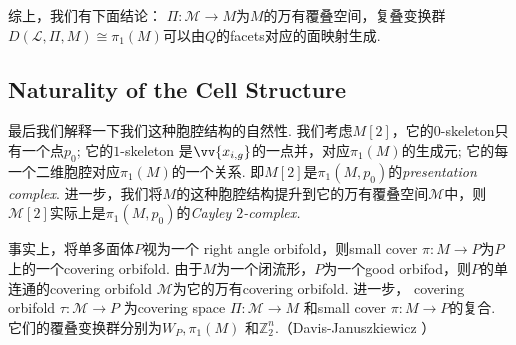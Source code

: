 \documentclass{article}
\theoremstyle{plain}%
\theoremstyle{definition}
\theoremstyle{remark}
\begin{document}
{%



综上，我们有下面结论：
{\thm $\Pi:\mathcal{M}\longrightarrow M$为$M$的万有覆叠空间，复叠变换群$D(\mathcal{L},\Pi,M)\cong\pi_1(M)$可以由$Q$的facets对应的面映射生成.}

\subsection{Naturality of the Cell Structure}
最后我们解释一下我们这种胞腔结构的自然性. 我们考虑$M[2]$，它的$0$-skeleton只有一个点$p_0$; 它的$1$-skeleton 是$\vv{x_{i,g}}$的一点并，对应$\pi_1(M)$的生成元; 它的每一个二维胞腔对应$\pi_1(M)$的一个关系. 即$M[2]$是$\pi_1(M,p_0)$的{\em presentation complex}.
进一步，我们将$M$的这种胞腔结构提升到它的万有覆叠空间$\mathcal{M}$中，则$\mathcal{M}[2]$实际上是$\pi_1(M,p_0)$的{\em Cayley $2$-complex.}

事实上，将单多面体$P$视为一个 right angle orbifold，则small cover $\pi:M\longrightarrow P$为$P$上的一个covering orbifold. 
由于$M$为一个闭流形，$P$为一个good orbifod，则$P$的单连通的covering orbifold $\mathcal{M}$为它的万有covering orbifold.
进一步，
covering orbifold $\tau:\mathcal{M}\longrightarrow P$ 为covering space $\Pi:\mathcal{M}\longrightarrow M$ 和small cover $\pi:M\longrightarrow P$的复合. 
它们的覆叠变换群分别为$W_P, \pi_1(M)$ 和$\mathbb{Z}_2^n$.（Davis-Januszkiewicz \cite{DJ1}）

}
\end{document}
